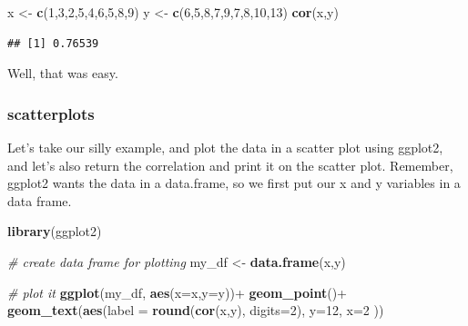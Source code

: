 \documentclass[]{book}
\newenvironment{Shaded}{\begin{snugshade}}{\end{snugshade}}
\newcommand{\KeywordTok}[1]{\textcolor[rgb]{0.13,0.29,0.53}{\textbf{{#1}}}}
\newcommand{\DataTypeTok}[1]{\textcolor[rgb]{0.13,0.29,0.53}{{#1}}}
\newcommand{\DecValTok}[1]{\textcolor[rgb]{0.00,0.00,0.81}{{#1}}}
\newcommand{\StringTok}[1]{\textcolor[rgb]{0.31,0.60,0.02}{{#1}}}
\newcommand{\CommentTok}[1]{\textcolor[rgb]{0.56,0.35,0.01}{\textit{{#1}}}}
\newcommand{\NormalTok}[1]{{#1}}
\theoremstyle{definition}
\theoremstyle{definition}
\theoremstyle{definition}
\theoremstyle{remark}
\begin{document}
\begin{Shaded}
\begin{Highlighting}[]
\NormalTok{x  <-}\StringTok{ }\KeywordTok{c}\NormalTok{(}\DecValTok{1}\NormalTok{,}\DecValTok{3}\NormalTok{,}\DecValTok{2}\NormalTok{,}\DecValTok{5}\NormalTok{,}\DecValTok{4}\NormalTok{,}\DecValTok{6}\NormalTok{,}\DecValTok{5}\NormalTok{,}\DecValTok{8}\NormalTok{,}\DecValTok{9}\NormalTok{)}
\NormalTok{y  <-}\StringTok{ }\KeywordTok{c}\NormalTok{(}\DecValTok{6}\NormalTok{,}\DecValTok{5}\NormalTok{,}\DecValTok{8}\NormalTok{,}\DecValTok{7}\NormalTok{,}\DecValTok{9}\NormalTok{,}\DecValTok{7}\NormalTok{,}\DecValTok{8}\NormalTok{,}\DecValTok{10}\NormalTok{,}\DecValTok{13}\NormalTok{)}
\KeywordTok{cor}\NormalTok{(x,y)}
\end{Highlighting}
\end{Shaded}

\begin{verbatim}
## [1] 0.76539
\end{verbatim}

Well, that was easy.

\subsubsection{scatterplots}\label{scatterplots}

Let's take our silly example, and plot the data in a scatter plot using
ggplot2, and let's also return the correlation and print it on the
scatter plot. Remember, ggplot2 wants the data in a data.frame, so we
first put our x and y variables in a data frame.

\begin{Shaded}
\begin{Highlighting}[]
\KeywordTok{library}\NormalTok{(ggplot2)}

\CommentTok{# create data frame for plotting}
\NormalTok{my_df <-}\StringTok{ }\KeywordTok{data.frame}\NormalTok{(x,y)}

\CommentTok{# plot it}
\KeywordTok{ggplot}\NormalTok{(my_df, }\KeywordTok{aes}\NormalTok{(}\DataTypeTok{x=}\NormalTok{x,}\DataTypeTok{y=}\NormalTok{y))+}
\StringTok{  }\KeywordTok{geom_point}\NormalTok{()+}
\StringTok{  }\KeywordTok{geom_text}\NormalTok{(}\KeywordTok{aes}\NormalTok{(}\DataTypeTok{label =} \KeywordTok{round}\NormalTok{(}\KeywordTok{cor}\NormalTok{(x,y), }\DataTypeTok{digits=}\DecValTok{2}\NormalTok{), }\DataTypeTok{y=}\DecValTok{12}\NormalTok{, }\DataTypeTok{x=}\DecValTok{2} \NormalTok{))}
\end{Highlighting}
\end{Shaded}
\end{document}
